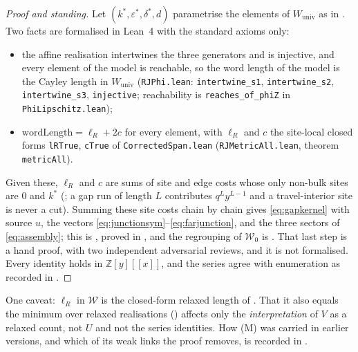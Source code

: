 \documentclass[11pt]{article}
\theoremstyle{plain}
\theoremstyle{definition}
\theoremstyle{remark}
\newcommand{\Z}{\mathbb{Z}}
\theoremstyle{plain}\newtheorem*{maintheorem}{Main Theorem}
\begin{document}
\begin{proof}[Proof and standing]
Let $(k^\ast,\varepsilon^\ast,\delta^\ast,d)$ parametrise the elements of $W_{\mathrm{univ}}$ as
in \cite[Theorem ``Normal form and lamp model'', \textup{thm:normal-form}]{Bonfioli2026a}. Two facts
are formalised in Lean~4 with the standard axioms only:
\begin{itemize}
\item the affine realisation intertwines the three generators and is injective, and every element
of the model is reachable, so the word length of the model is the Cayley length in
$W_{\mathrm{univ}}$ (\texttt{RJPhi.lean}: \texttt{intertwine\_s1}, \texttt{intertwine\_s2},
\texttt{intertwine\_s3}, \texttt{injective}; reachability is \texttt{reaches\_of\_phiZ} in
\texttt{PhiLipschitz.lean});
\item $\mathrm{wordLength}=\ell_R+2c$ for every element, with $\ell_R$ and $c$ the site-local
closed forms \texttt{lRTrue}, \texttt{cTrue} of \texttt{CorrectedSpan.lean}
(\texttt{RJMetricAll.lean}, theorem \texttt{metricAll}).
\end{itemize}
Given these, $\ell_R$ and $c$ are sums of site and edge costs whose only non-bulk sites are $0$ and
$k^\ast$ (\cite[Corollaries \textup{cor:localcost} and \textup{cor:marker}]{Bonfioli2026bB}; a gap run of length $L$ contributes
$q^Ly^{L-1}$ and a travel-interior site is never a cut). Summing these site costs chain by chain
gives \eqref{eq:gapkernel} with source $u$, the vectors
\eqref{eq:junctionsym}--\eqref{eq:farjunction}, and the three sectors of \eqref{eq:assembly}; this
is {\cite[Theorem ``\textup{(M3$'$)}'', \textup{thm:M3prime}]{Bonfioli2026bB}}, proved in {\cite[Appendix \textup{app:M3prime}]{Bonfioli2026bB}}, and the regrouping of
$\mathcal W_0$ is {\cite[Remark ``the regrouping of $\mathcal W_0$'', \textup{M3:rem:W0regroup}]{Bonfioli2026bB}}. That last step is a hand proof, with two
independent adversarial reviews, and it is not formalised. Every identity holds in
$\Z[y][[x]]$, and the series agree with enumeration as recorded in {\cite[\S\,\textup{sec:bridge}]{Bonfioli2026bB}}.
\end{proof}

\noindent One caveat: $\ell_R$ in $\mathcal W$ is the closed-form relaxed length of
\cite{Bonfioli2026a}. That it also equals the minimum over relaxed realisations
(\cite[Remark \textup{rem:metric-formula-status}]{Bonfioli2026a}) affects only the \emph{interpretation}
of $V$ as a relaxed count, not $U$ and not the series identities. How \textup{(M)} was carried in
earlier versions, and which of its weak links the proof removes, is recorded in
{\cite[\S\,\textup{sec:inputL}]{Bonfioli2026bB}}.
\end{document}
